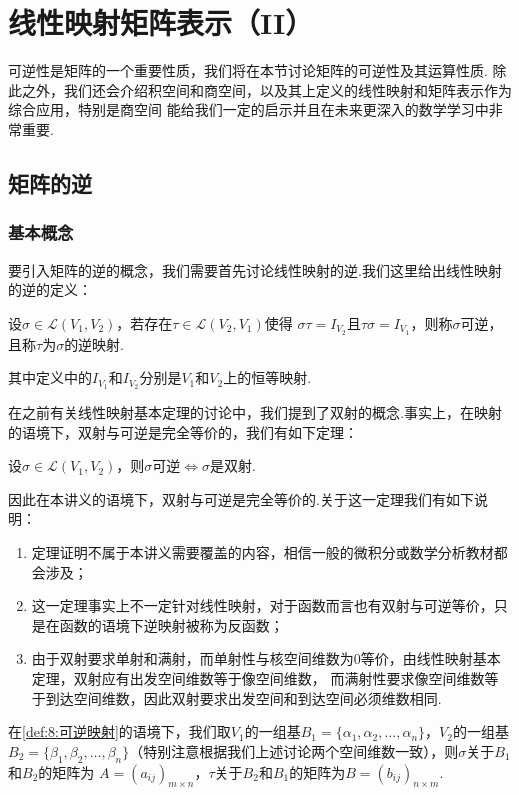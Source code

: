 \chapter{线性映射矩阵表示（II）}

可逆性是矩阵的一个重要性质，我们将在本节讨论矩阵的可逆性及其运算性质.
除此之外，我们还会介绍积空间和商空间，以及其上定义的线性映射和矩阵表示作为综合应用，特别是商空间
能给我们一定的启示并且在未来更深入的数学学习中非常重要.

\section{矩阵的逆}
\subsection{基本概念}
要引入矩阵的逆的概念，我们需要首先讨论线性映射的逆.我们这里给出线性映射的逆的定义：
\begin{definition}\label{def:8:可逆映射}
    设$\sigma \in \mathcal{L}(V_1,V_2)$，若存在$\tau \in \mathcal{L}(V_2,V_1)$使得
    $\sigma \tau = I_{V_2}$且$\tau \sigma = I_{V_1}$，则称$\sigma$可逆，且称$\tau$为$\sigma$的逆映射.
\end{definition}
其中定义中的$I_{V_1}$和$I_{V_2}$分别是$V_1$和$V_2$上的恒等映射.

在之前有关线性映射基本定理的讨论中，我们提到了双射的概念.事实上，在映射的语境下，双射与可逆是完全等价的，我们有如下定理：
\begin{theorem}
    设$\sigma \in \mathcal{L}(V_1,V_2)$，则$\sigma$可逆$\iff \sigma$是双射.
\end{theorem}

因此在本讲义的语境下，双射与可逆是完全等价的.关于这一定理我们有如下说明：
\begin{enumerate}
    \item 定理证明不属于本讲义需要覆盖的内容，相信一般的微积分或数学分析教材都会涉及；
    \item 这一定理事实上不一定针对线性映射，对于函数而言也有双射与可逆等价，只是在函数的语境下逆映射被称为反函数；
    \item 由于双射要求单射和满射，而单射性与核空间维数为0等价，由线性映射基本定理，双射应有出发空间维数等于像空间维数，
    而满射性要求像空间维数等于到达空间维数，因此双射要求出发空间和到达空间必须维数相同.
\end{enumerate}

在\autoref{def:8:可逆映射}的语境下，我们取$V_1$的一组基$B_1=\{\alpha_1,\alpha_2,\ldots,\alpha_n\}$，$V_2$的一组基
$B_2=\{\beta_1,\beta_2,\ldots,\beta_n\}$（特别注意根据我们上述讨论两个空间维数一致），则$\sigma$关于$B_1$和$B_2$的矩阵为
$A=(a_{ij})_{m \times n}$，$\tau$关于$B_2$和$B_1$的矩阵为$B=(b_{ij})_{n \times m}$.

